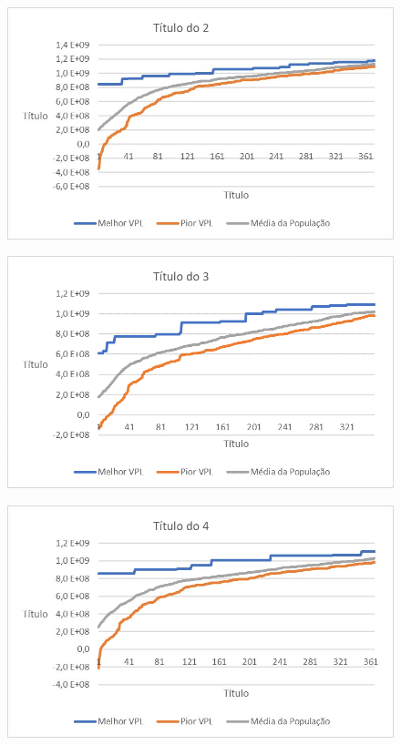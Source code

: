 \documentclass[12pt,a4paper]{report}
\begin{document}
\begin{figure}[H]
\centering

\includegraphics[scale=1]{AGRPCO2/2}

\end{figure}

\begin{figure}[H]
\centering

\includegraphics[scale=1]{AGRPCO2/3}

\end{figure}

\begin{figure}[H]
\centering

\includegraphics[scale=1]{AGRPCO2/4}

\end{figure}
\end{document}
